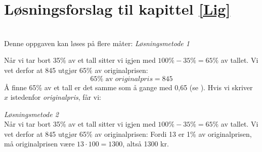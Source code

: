 

\usepackage{xr}




\section*{Løsningsforslag til kapittel \ref*{Lig}}
\\ Denne oppgaven kan løses på flere måter:\os
\textit{Løsningsmetode 1}

Når vi tar bort 35\% av et tall sitter vi igjen med $ {100\%-35\%=65\%} $ av tallet. Vi vet derfor at 845 utgjør 65\% av originalprisen:
\[ 65\%\text{ av } \textit{originalpris}=845 \] 
Å finne 65\% av et tall er det samme som å gange med 0,65 (se ). Hvis vi skriver $ x $ istedenfor \textit{originalpris}, får vi:

\textit{Løsningsmetode 2}\\
Når vi tar bort 35\% av et tall sitter vi igjen med $ {100\%-35\%=65\%} $ av tallet. Vi vet derfor at 845 utgjør 65\% av originalprisen:
Fordi 13 er 1\% av originalprisen, må originalprisen være $ {13\cdot100}=1300 $, altså 1300 kr. 


